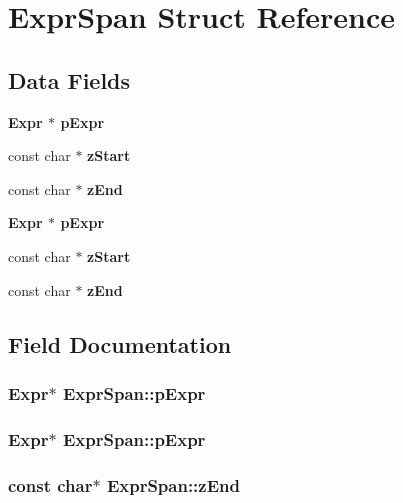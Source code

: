 \section{Expr\-Span Struct Reference}
\label{structExprSpan}
\subsection*{Data Fields}
\begin{CompactItemize}
\item 
\bf{Expr} $\ast$ \bf{p\-Expr}
\item 
const char $\ast$ \bf{z\-Start}
\item 
const char $\ast$ \bf{z\-End}
\item 
\bf{Expr} $\ast$ \bf{p\-Expr}
\item 
const char $\ast$ \bf{z\-Start}
\item 
const char $\ast$ \bf{z\-End}
\end{CompactItemize}


\subsection{Field Documentation}
\subsubsection{\setlength{\rightskip}{0pt plus 5cm}\bf{Expr}$\ast$ \bf{Expr\-Span::p\-Expr}}\label{structExprSpan_6ae803fe1e09864bb78263adbb0fe3e6}


\subsubsection{\setlength{\rightskip}{0pt plus 5cm}\bf{Expr}$\ast$ \bf{Expr\-Span::p\-Expr}}\label{structExprSpan_6ae803fe1e09864bb78263adbb0fe3e6}


\subsubsection{\setlength{\rightskip}{0pt plus 5cm}const char$\ast$ \bf{Expr\-Span::z\-End}}\label{structExprSpan_1fe6f556413359ab7874517cfbf3c8ff}


